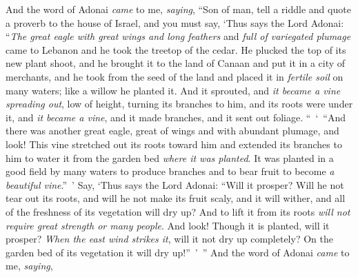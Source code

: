 \begin{biblechapter} %
 And the word of Adonai \textit{came} to me, \textit{saying},
\verse “Son of man, tell a riddle and quote a proverb to the house of Israel,
\verse and you must say, ‘Thus says the Lord Adonai: “\textit{The great eagle with great wings and long feathers} and \textit{full of variegated plumage} came to Lebanon and he took the treetop of the cedar.
\verse He plucked the top of its new plant shoot, and he brought it to the land of Canaan and put it in a city of merchants,
\verse and he took from the seed of the land and placed it in \textit{fertile soil} on many waters; like a willow he planted it.
\verse And it sprouted, and \textit{it became a vine spreading out}, low of height, turning its branches to him, and its roots were under it, and \textit{it became a vine}, and it made branches, and it sent out foliage.
\verse “ ‘ “And there was another great eagle, great of wings and with abundant plumage, and look! This vine stretched out its roots toward him and extended its branches to him to water it from the garden bed \textit{where it was planted}.
\verse It was planted in a good field by many waters to produce branches and to bear fruit to become \textit{a beautiful vine}.” ’
\verse Say, ‘Thus says the Lord Adonai: “Will it prosper? Will he not tear out its roots, and will he not make its fruit scaly, and it will wither, and all of the freshness of its vegetation will dry up? And to lift it from its roots \textit{will not require great strength or many people}.
\verse And look! Though it is planted, will it prosper? \textit{When the east wind strikes it}, will it not dry up completely? On the garden bed of its vegetation it will dry up!” ’ ”
\verse And the word of Adonai \textit{came} to me, \textit{saying},

\end{biblechapter}
